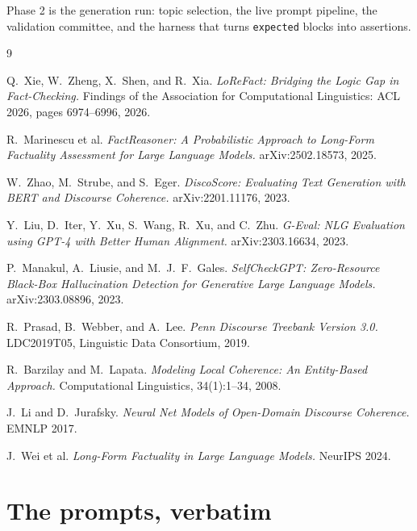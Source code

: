 \documentclass[11pt]{article}
\begin{document}
Phase 2 is the generation run: topic selection, the live prompt pipeline, the validation
committee, and the harness that turns \texttt{expected} blocks into assertions.

\begin{thebibliography}{9}\small

 Q.~Xie, W.~Zheng, X.~Shen, and R.~Xia.
  \emph{LoReFact: Bridging the Logic Gap in Fact-Checking.}
  Findings of the Association for Computational Linguistics: ACL 2026, pages 6974--6996, 2026.

 R.~Marinescu et al.
  \emph{FactReasoner: A Probabilistic Approach to Long-Form Factuality Assessment for Large
  Language Models.} arXiv:2502.18573, 2025.

 W.~Zhao, M.~Strube, and S.~Eger.
  \emph{DiscoScore: Evaluating Text Generation with BERT and Discourse Coherence.}
  arXiv:2201.11176, 2023.

 Y.~Liu, D.~Iter, Y.~Xu, S.~Wang, R.~Xu, and C.~Zhu.
  \emph{G-Eval: NLG Evaluation using GPT-4 with Better Human Alignment.}
  arXiv:2303.16634, 2023.

 P.~Manakul, A.~Liusie, and M.~J.~F.~Gales.
  \emph{SelfCheckGPT: Zero-Resource Black-Box Hallucination Detection for Generative Large
  Language Models.} arXiv:2303.08896, 2023.

 R.~Prasad, B.~Webber, and A.~Lee.
  \emph{Penn Discourse Treebank Version 3.0.} LDC2019T05, Linguistic Data Consortium, 2019.

 R.~Barzilay and M.~Lapata.
  \emph{Modeling Local Coherence: An Entity-Based Approach.}
  Computational Linguistics, 34(1):1--34, 2008.

 J.~Li and D.~Jurafsky.
  \emph{Neural Net Models of Open-Domain Discourse Coherence.}
  EMNLP 2017.

 J.~Wei et al.
  \emph{Long-Form Factuality in Large Language Models.} NeurIPS 2024.

\end{thebibliography}

\appendix
\section{The prompts, verbatim}
\label{app:prompts}
\end{document}
